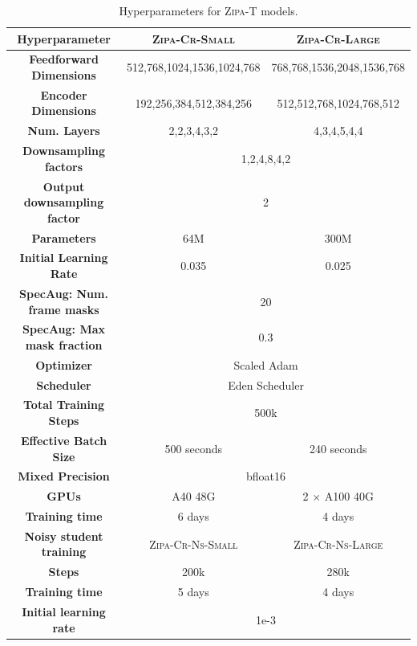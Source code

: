 \documentclass[11pt]{article}
\begin{document}
\begin{table}[h!]
\small
\centering
\begin{tabular}{ccc}
\toprule
\textbf{Hyperparameter}               & \textsc{Zipa-Cr-Small} & \textsc{Zipa-Cr-Large}  \\ \midrule
\textbf{Feedforward Dimensions}            & 512,768,1024,1536,1024,768                   & 768,768,1536,2048,1536,768                                     \\ 
\textbf{Encoder Dimensions} & 192,256,384,512,384,256 & 512,512,768,1024,768,512\\
\textbf{Num. Layers}                  & 2,2,3,4,3,2                     & 4,3,4,5,4,4                                         \\ 
\textbf{Downsampling factors}         & \multicolumn{2}{c}{1,2,4,8,4,2}                            \\ 
\textbf{Output downsampling factor}         & \multicolumn{2}{c}{2}                            \\ 
\textbf{Parameters}                   & 64M                   & 300M                               \\ 
\textbf{Initial Learning Rate}        & 0.035                  & 0.025                                  \\
\textbf{SpecAug: Num. frame masks} &\multicolumn{2}{c}{20} \\
\textbf{SpecAug: Max mask fraction} & \multicolumn{2}{c}{0.3} \\
\textbf{Optimizer} & \multicolumn{2}{c}{Scaled Adam}             \\ 
\textbf{Scheduler}                    & \multicolumn{2}{c}{Eden Scheduler}             \\ 
\textbf{Total Training Steps}         & \multicolumn{2}{c}{500k}          \\ 
\textbf{Effective Batch Size}        & 500 seconds                    & 240 seconds                                      \\ 
\textbf{Mixed Precision}              & \multicolumn{2}{c}{bfloat16}                            \\ 
\textbf{GPUs} & A40 48G & 2 $\times$ A100 40G \\
\textbf{Training time} & 6 days & 4 days \\\midrule
\textbf{Noisy student training} & \textsc{Zipa-Cr-Ns-Small} & \textsc{Zipa-Cr-Ns-Large}\\\midrule
\textbf{Steps} & 200k & 280k \\
\textbf{Training time} & 5 days & 4 days \\
\textbf{Initial learning rate} & \multicolumn{2}{c}{1e-3} \\    
\bottomrule
\end{tabular}
\caption{Hyperparameters for \textsc{Zipa-T} models.}
\label{tab:zipa-cr-hyper}
\end{table}



\end{document}
